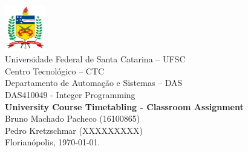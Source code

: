 \documentclass[a4paper,11pt]{article}
\begin{document}
	\thispagestyle{empty}
\begin{center}
	\includegraphics[height=2cm]{imagens/logoUFSCsimples.png} \\
	{\Large Universidade Federal de Santa Catarina -- UFSC} \\
	{\Large Centro Tecnológico -- CTC} \\
	{\Large Departamento de Automação e Sistemas -- DAS} \\
	\vspace{1cm}
	{\large DAS410049 - Integer Programming} \\
	\vfill
	\large{\textbf{University Course Timetabling - Classroom Assignment} \\
	} 
	\vspace{1cm}
    Bruno Machado Pacheco (16100865) \\
    Pedro Kretzschmar (XXXXXXXXX) \\
    \vfill
	Florianópolis, \today.
\end{center}

\clearpage

\tableofcontents

\clearpage



\FloatBarrier
\newpage


\FloatBarrier
\newpage


\FloatBarrier
\newpage


\FloatBarrier
\newpage


\FloatBarrier
\newpage


\newpage
\end{document}
